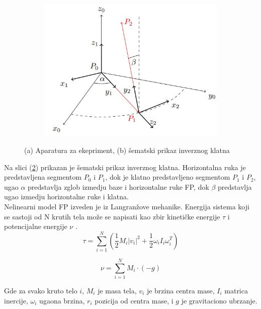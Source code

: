 \documentclass[a4paper,11pt]{article}
\theoremstyle{definition} \newtheorem{deff}{Definicija}[section]
\theoremstyle{definition} \newtheorem{prim}[deff]{Primer}
\theoremstyle{plain} \newtheorem{teor}[deff]{Teorema}
\begin{document}
\begin{figure}[!htb]
\begin{subfigure}{0.5\linewidth}
			\includegraphics[width=\linewidth]{slike/shema.jpg}
			\caption{}
			\label{fig:schema}
		\end{subfigure}
		\caption{(a) Aparatura za ekepriment, (b) šematski prikaz inverznog klatna \cite{inicijalna} }
	\end{figure}
	
	
	Na slici (\ref{fig:schema}) prikazan je šematski prikaz inverznog klatna. Horizontalna ruka je predstavljena segmentom $P_0$ i $P_1$, dok je klatno predstavljeno segmentom $P_1$ i $P_2$, ugao $\alpha$ predstavlja zglob izmedju baze i horizontalne ruke FP, dok $\beta$ predstavlja ugao izmedju horizontalne ruke i klatna.
	\\
	
	Nelinearni model FP izveden je iz Langranžove mehanike. Energija sistema koji se sastoji od N krutih tela može se napisati kao zbir kinetičke energije $\tau$ i potencijalne energije $\nu$ \cite{inicijalna}. 
	\begin{equation}
		\tau = \sum_{i=1}^{N} \left( \frac{1}{2} M_i |v_i|^2 + \frac{1}{2} \omega_i I_i \omega_i^T \right)
	\end{equation}
	
	\begin{equation}
		\nu = \sum_{i=1}^{N} M_i \cdot (-g)
	\end{equation}
	
	
	
	Gde za svako kruto telo $i$, $M_i$ je masa tela, $v_i$ je brzina centra mase, $I_i$ matrica inercije, $\omega_i$ ugaona brzina, $r_i$ pozicija od centra mase, i $g$ je gravitaciono ubrzanje.\\
	
\end{document}
